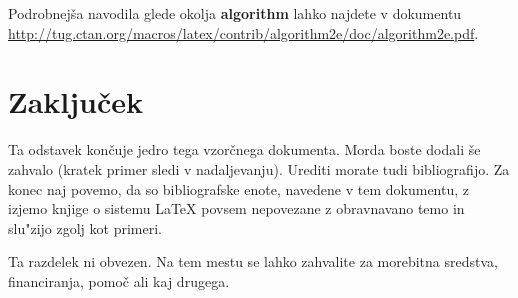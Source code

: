 \documentclass[sigconf,nonacm]{acmart}
\begin{document}
Podrobnejša navodila glede okolja
\textbf{algorithm} lahko najdete v dokumentu
\url{http://tug.ctan.org/macros/latex/contrib/algorithm2e/doc/algorithm2e.pdf}.

\section{Zaključek}

Ta odstavek končuje jedro tega vzorčnega dokumenta.  Morda boste dodali še
zahvalo (kratek primer sledi v nadaljevanju).  Urediti morate tudi
bibliografijo.  Za konec naj povemo, da so bibliografske enote, navedene v tem
dokumentu, z izjemo knjige o sistemu \LaTeX{} povsem nepovezane z obravnavano
temo in slu"zijo zgolj kot primeri.

\begin{acks}
    Ta razdelek ni obvezen.  Na tem mestu se lahko zahvalite za morebitna
    sredstva, financiranja, pomoč ali kaj drugega.
\end{acks}



\end{document}

